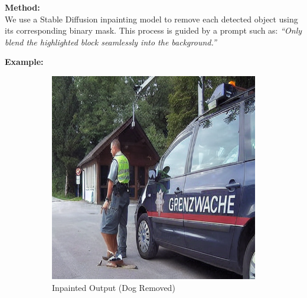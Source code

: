 \documentclass[11pt,letterpaper]{article}
\begin{document}
\noindent
\textbf{Method:} \\
We use a Stable Diffusion inpainting model to remove each detected object using its corresponding binary mask. This process is guided by a prompt such as: \emph{``Only blend the highlighted block seamlessly into the background.''}

\noindent
\textbf{Example:}
\begin{figure}[h]
    \centering
    \begin{subfigure}[b]{0.2\textwidth}
        \centering
        \includegraphics[width=\textwidth]{midterm_report/assets/output_dog.png}
        \caption{Inpainted Output (Dog Removed)}
        \label{fig:inpaint_dog}
    \end{subfigure}
    \hfill
    \begin{subfigure}[b]{0.2\textwidth}
        \centering

\end{subfigure}
\end{figure}
\end{document}

